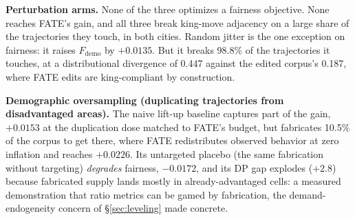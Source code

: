 \textbf{Perturbation arms.} None of the three optimizes a fairness objective.
None reaches FATE's gain, and all three break king-move adjacency on a large
share of the trajectories they touch, in both cities. Random jitter is the one
exception on fairness: it raises $F_{\mathrm{demo}}$ by $+0.0135$. But it
breaks 98.8\% of the trajectories it touches, at a distributional divergence
of 0.447 against the edited corpus's 0.187, where FATE edits are
king-compliant by construction.

\textbf{Demographic oversampling (duplicating trajectories from disadvantaged
areas).} The naive lift-up baseline captures part of
the gain,
$+0.0153$ at the duplication dose matched to FATE's budget, but
fabricates 10.5\% of the corpus to get there, where FATE redistributes
observed behavior at zero inflation and reaches $+0.0226$. Its untargeted
placebo (the same fabrication without targeting) \emph{degrades} fairness,
$-0.0172$, and its DP gap explodes ($+2.8$) because fabricated supply lands
mostly in already-advantaged cells: a measured demonstration that ratio
metrics can be gamed by fabrication, the demand-endo\-ge\-ne\-ity concern of
\S\ref{sec:leveling} made concrete.

